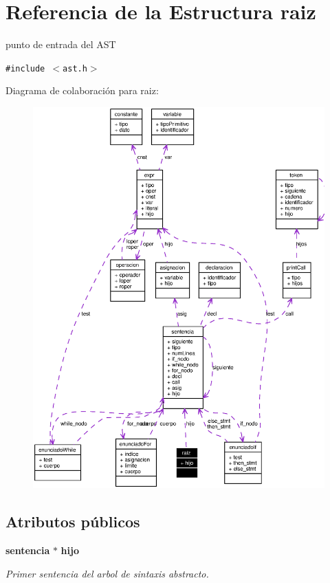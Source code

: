 \section{Referencia de la Estructura raiz}
\label{structraiz}
punto de entrada del AST  


{\tt \#include $<$ast.h$>$}

Diagrama de colaboraci\'{o}n para raiz:\begin{figure}[H]
\begin{center}
\leavevmode
\includegraphics[width=320pt]{structraiz__coll__graph}
\end{center}
\end{figure}
\subsection*{Atributos p\'{u}blicos}
\begin{CompactItemize}
\item 
{\bf sentencia} $\ast$ {\bf hijo}
\begin{CompactList}\small\item\em Primer sentencia del arbol de sintaxis abstracto. \item\end{CompactList}\end{CompactItemize}


